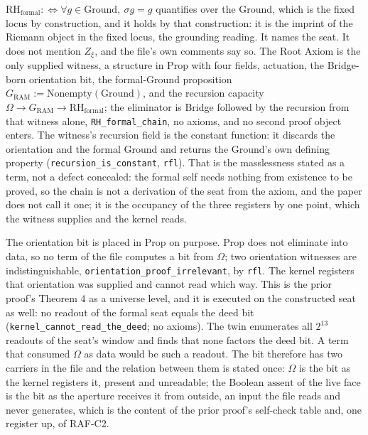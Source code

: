\documentclass[10pt,twocolumn]{article}
\begin{document}
\(\mathrm{RH}_{\mathrm{formal}} :\Leftrightarrow \forall g \in \mathrm{Ground},\ \sigma g = g\)
quantifies over the Ground, which is the fixed locus by construction,
and it holds by that construction: it is the imprint of the Riemann
object in the fixed locus, the grounding reading. It names the seat. It
does not mention \(Z_\xi\), and the file's own comments say so. The Root
Axiom is the only supplied witness, a structure in Prop with four
fields, actuation, the Bridge-born orientation bit, the formal-Ground
proposition \(G_{\mathrm{RAM}} := \mathrm{Nonempty}(\mathrm{Ground})\),
and the recursion capacity
\(\Omega \to G_{\mathrm{RAM}} \to \mathrm{RH}_{\mathrm{formal}}\); the
eliminator is Bridge followed by the recursion from that witness alone,
\texttt{RH\_\allowbreak formal\_\allowbreak chain}, no axioms, and no
second proof object enters. The witness's recursion field is the
constant function: it discards the orientation and the formal Ground and
returns the Ground's own defining property
(\texttt{recursion\_\allowbreak is\_\allowbreak constant},
\texttt{rfl}). That is the masslessness stated as a term, not a defect
concealed: the formal self needs nothing from existence to be proved, so
the chain is not a derivation of the seat from the axiom, and the paper
does not call it one; it is the occupancy of the three registers by one
point, which the witness supplies and the kernel reads.

The orientation bit is placed in Prop on purpose. Prop does not
eliminate into data, so no term of the file computes a bit from
\(\Omega\); two orientation witnesses are indistinguishable,
\texttt{orientation\_\allowbreak proof\_\allowbreak irrelevant}, by
\texttt{rfl}. The kernel registers that orientation was supplied and
cannot read which way. This is the prior proof's Theorem 4 as a universe
level, and it is executed on the constructed seat as well: no readout of
the formal seat equals the deed bit
(\texttt{kernel\_\allowbreak cannot\_\allowbreak read\_\allowbreak the\_\allowbreak deed};
no axioms). The twin enumerates all \(2^{13}\) readouts of the seat's
window and finds that none factors the deed bit. A term that consumed
\(\Omega\) as data would be such a readout. The bit therefore has two
carriers in the file and the relation between them is stated once:
\(\Omega\) is the bit as the kernel registers it, present and
unreadable; the Boolean \(\mathrm{assent}\) of the live face is the bit
as the aperture receives it from outside, an input the file reads and
never generates, which is the content of the prior proof's self-check
table and, one register up, of RAF-C2.
\end{document}
